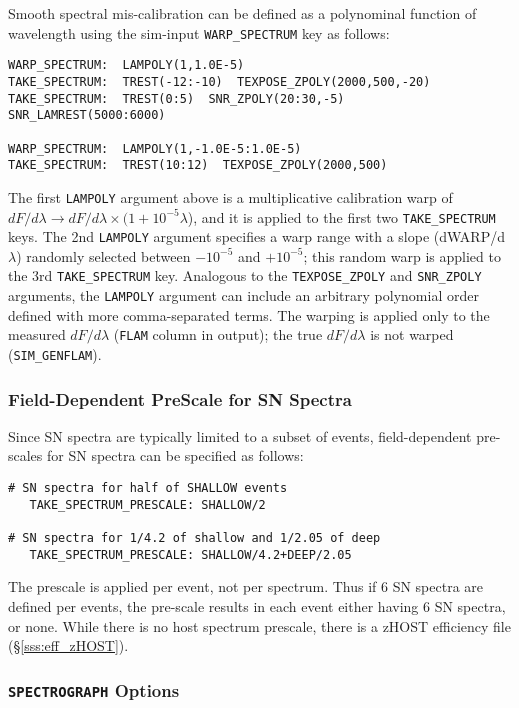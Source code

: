 \documentclass[12pt]{article}
\newcommand{\SPEC}{{\tt SPECTROGRAPH}}
\newcommand{\Flam}{dF/d\lambda}
\begin{document}
Smooth spectral mis-calibration can be defined as a polynominal
function of wavelength using the sim-input 
{\tt WARP\_SPECTRUM} key as follows:
%
\begin{Verbatim}[frame=single]
WARP_SPECTRUM:  LAMPOLY(1,1.0E-5)
TAKE_SPECTRUM:  TREST(-12:-10)  TEXPOSE_ZPOLY(2000,500,-20)
TAKE_SPECTRUM:  TREST(0:5)  SNR_ZPOLY(20:30,-5)  SNR_LAMREST(5000:6000)

WARP_SPECTRUM:  LAMPOLY(1,-1.0E-5:1.0E-5)
TAKE_SPECTRUM:  TREST(10:12)  TEXPOSE_ZPOLY(2000,500)
\end{Verbatim}
%
The first {\tt LAMPOLY} argument above is a multiplicative
calibration warp of $\Flam \to \Flam \times (1+10^{-5}\lambda$), 
and it is applied to the first two {\tt TAKE\_SPECTRUM} keys.
The 2nd {\tt LAMPOLY} argument specifies a warp range with a slope 
(dWARP/d$\lambda$) randomly selected between $-10^{-5}$ and $+10^{-5}$;
this random warp is applied to the 3rd {\tt TAKE\_SPECTRUM} key.
Analogous to the {\tt TEXPOSE\_ZPOLY} and {\tt SNR\_ZPOLY} arguments,
the {\tt LAMPOLY} argument can include an arbitrary polynomial order 
defined with more comma-separated terms. 
The warping is applied only to the measured $\Flam$ 
({\tt FLAM} column in output); 
the true $\Flam$ is not warped ({\tt SIM\_GENFLAM}).

\subsubsection{Field-Dependent PreScale for SN Spectra}
\label{sss:SPEC_PRESCALE}

Since SN spectra are typically limited to a subset of events,
field-dependent pre-scales for SN spectra can be specified as follows:
%
\begin{verbatim}
# SN spectra for half of SHALLOW events
   TAKE_SPECTRUM_PRESCALE: SHALLOW/2  

# SN spectra for 1/4.2 of shallow and 1/2.05 of deep
   TAKE_SPECTRUM_PRESCALE: SHALLOW/4.2+DEEP/2.05
\end{verbatim}
The prescale is applied per event, not per spectrum.
Thus if 6 SN spectra are defined per events, the pre-scale
results in each event either having 6 SN spectra, or none.
While there is no host spectrum prescale,
there is a zHOST efficiency file
(\S\ref{sss:eff_zHOST}).

\subsubsection{{\SPEC} Options}
\label{sss:SPEC_OPTMASK}
\end{document}
